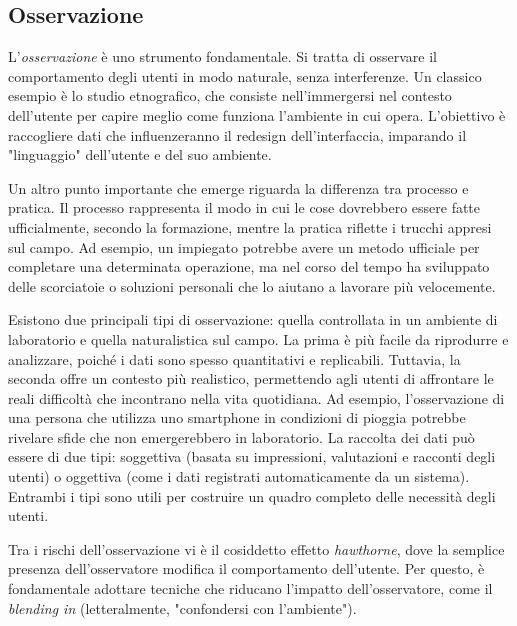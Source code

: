 \subsection{Osservazione}
L’\textit{osservazione} è uno strumento fondamentale. Si tratta di osservare il comportamento degli utenti in modo naturale, senza interferenze. Un classico esempio è lo studio etnografico, che consiste nell'immergersi nel contesto dell'utente per capire meglio come funziona l'ambiente in cui opera. L'obiettivo è raccogliere dati che influenzeranno il redesign dell'interfaccia, imparando il "linguaggio" dell'utente e del suo ambiente.

Un altro punto importante che emerge riguarda la differenza tra processo e pratica. Il processo rappresenta il modo in cui le cose dovrebbero essere fatte ufficialmente, secondo la formazione, mentre la pratica riflette i trucchi appresi sul campo. Ad esempio, un impiegato potrebbe avere un metodo ufficiale per completare una determinata operazione, ma nel corso del tempo ha sviluppato delle scorciatoie o soluzioni personali che lo aiutano a lavorare più velocemente.

Esistono due principali tipi di osservazione: quella controllata in un ambiente di laboratorio e quella naturalistica sul campo. La prima è più facile da riprodurre e analizzare, poiché i dati sono spesso quantitativi e replicabili. Tuttavia, la seconda offre un contesto più realistico, permettendo agli utenti di affrontare le reali difficoltà che incontrano nella vita quotidiana. Ad esempio, l'osservazione di una persona che utilizza uno smartphone in condizioni di pioggia potrebbe rivelare sfide che non emergerebbero in laboratorio. La raccolta dei dati può essere di due tipi: soggettiva (basata su impressioni, valutazioni e racconti degli utenti) o oggettiva (come i dati registrati automaticamente da un sistema). Entrambi i tipi sono utili per costruire un quadro completo delle necessità degli utenti.

Tra i rischi dell'osservazione vi è il cosiddetto effetto \textit{hawthorne}, dove la semplice presenza dell'osservatore modifica il comportamento dell'utente. Per questo, è fondamentale adottare tecniche che riducano l'impatto dell'osservatore, come il \textit{blending in} (letteralmente, "confondersi con l’ambiente").

